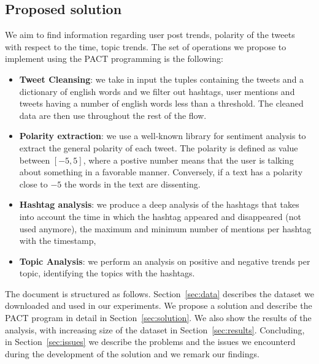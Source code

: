 \subsection{Proposed solution}
We aim to find information regarding user post trends, polarity of the tweets with respect to the time, topic trends. 
The set of operations we propose to implement using the PACT programming is the following:  
\begin{itemize}
\item \textbf{Tweet Cleansing}: we take in input the tuples containing the tweets and a dictionary of english words and we filter out hashtags, user mentions and tweets having a number of english words less than a threshold. The cleaned data are then use throughout the rest of the flow. 
\item \textbf{Polarity extraction}: we use a well-known library for sentiment analysis to extract the general polarity of each tweet. The polarity is defined as value between $[-5,5]$, where a postive number means that the user is talking about something in a favorable manner. Conversely, if a text has a polarity close to $-5$ the words in the text are dissenting. 
\item \textbf{Hashtag analysis}: we produce a deep analysis of the hashtags that takes into account the time in which the hashtag appeared and disappeared (not used anymore), the maximum and minimum number of mentions per hashtag with the timestamp,  
\item \textbf{Topic Analysis}:  we perform an analysis on positive and negative trends per topic, identifying the topics with the hashtags. 
\end{itemize}

The document is structured as follows. Section~\ref{sec:data} describes the dataset we downloaded and used in our experiments. We propose a solution and describe the PACT program in detail in Section~\ref{sec:solution}. We also show the results of the analysis, with increasing size of the dataset in Section~\ref{sec:results}. Concluding, in Section~\ref{sec:issues} we describe the problems and the issues we encounterd during the development of the solution and we remark our findings.
